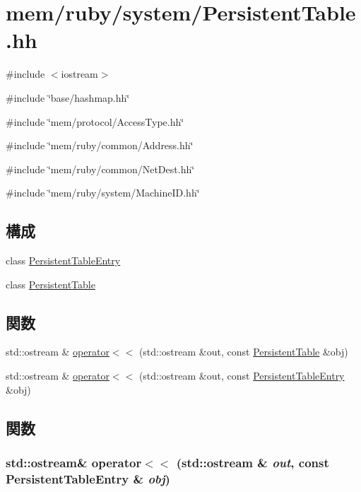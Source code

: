 \hypertarget{PersistentTable_8hh}{
\section{mem/ruby/system/PersistentTable.hh}
\label{PersistentTable_8hh}
}
{\ttfamily \#include $<$iostream$>$}\par
{\ttfamily \#include \char`\"{}base/hashmap.hh\char`\"{}}\par
{\ttfamily \#include \char`\"{}mem/protocol/AccessType.hh\char`\"{}}\par
{\ttfamily \#include \char`\"{}mem/ruby/common/Address.hh\char`\"{}}\par
{\ttfamily \#include \char`\"{}mem/ruby/common/NetDest.hh\char`\"{}}\par
{\ttfamily \#include \char`\"{}mem/ruby/system/MachineID.hh\char`\"{}}\par
\subsection*{構成}
\begin{DoxyCompactItemize}
\item 
class \hyperlink{classPersistentTableEntry}{PersistentTableEntry}
\item 
class \hyperlink{classPersistentTable}{PersistentTable}
\end{DoxyCompactItemize}
\subsection*{関数}
\begin{DoxyCompactItemize}
\item 
std::ostream \& \hyperlink{PersistentTable_8hh_acaf9bf6abaa13b0eefc4a75a2f15886a}{operator$<$$<$} (std::ostream \&out, const \hyperlink{classPersistentTable}{PersistentTable} \&obj)
\item 
std::ostream \& \hyperlink{PersistentTable_8hh_a496c0c8ad498e60c4a18f09915b487cf}{operator$<$$<$} (std::ostream \&out, const \hyperlink{classPersistentTableEntry}{PersistentTableEntry} \&obj)
\end{DoxyCompactItemize}


\subsection{関数}
\hypertarget{PersistentTable_8hh_a496c0c8ad498e60c4a18f09915b487cf}{
\subsubsection[{operator$<$$<$}]{\setlength{\rightskip}{0pt plus 5cm}std::ostream\& operator$<$$<$ (std::ostream \& {\em out}, \/  const {\bf PersistentTableEntry} \& {\em obj})}}
\label{PersistentTable_8hh_a496c0c8ad498e60c4a18f09915b487cf}



